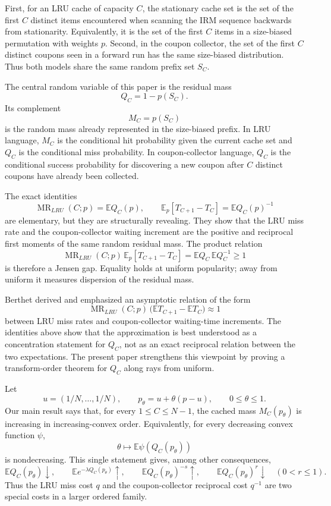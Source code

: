 \documentclass[11pt]{article}
\newcommand{\E}{\mathbb E}
\newcommand{\1}{\mathbf 1}
\newcommand{\MR}{\operatorname{MR}}
\begin{document}
First, for an LRU cache of capacity $C$, the stationary cache set is the set of the first
$C$ distinct items encountered when scanning the IRM sequence backwards from stationarity.
Equivalently, it is the set of the first $C$ items in a size-biased permutation with
weights $p$.  Second, in the coupon collector, the set of the first $C$ distinct coupons
seen in a forward run has the same size-biased distribution.  Thus both models share the
same random prefix set $S_C$.

The central random variable of this paper is the residual mass
\[
        Q_C=1-p(S_C).
\]
Its complement
\[
        M_C=p(S_C)
\]
is the random mass already represented in the size-biased prefix.  In LRU language,
$M_C$ is the conditional hit probability given the current cache set and $Q_C$ is the
conditional miss probability.  In coupon-collector language, $Q_C$ is the conditional
success probability for discovering a new coupon after $C$ distinct coupons have already
been collected.

The exact identities
\begin{equation}\label{eq:basic-identities-intro}
        \MR_{LRU}(C;p)=\E Q_C(p),
        \qquad
        \E_p[T_{C+1}-T_C]=\E Q_C(p)^{-1}
\end{equation}
are elementary, but they are structurally revealing.  They show that the LRU miss rate
and the coupon-collector waiting increment are the positive and reciprocal first moments
of the same random residual mass.  The product relation
\[
        \MR_{LRU}(C;p)\,\E_p[T_{C+1}-T_C]
        =\E Q_C\,\E Q_C^{-1}\ge 1
\]
is therefore a Jensen gap.  Equality holds at uniform popularity; away from uniform it
measures dispersion of the residual mass.

Berthet \cite{Berthet2017} derived and emphasized an asymptotic relation of the form
\[
        \MR_{LRU}(C;p)\,\bigl(\E T_{C+1}-\E T_C\bigr)\approx 1
\]
between LRU miss rates and coupon-collector waiting-time increments.  The identities
above show that the approximation is best understood as a concentration statement for
$Q_C$, not as an exact reciprocal relation between the two expectations.  The present
paper strengthens this viewpoint by proving a transform-order theorem for $Q_C$ along
rays from uniform.

Let
\[
        u=(1/N,\ldots,1/N),\qquad
        p_\theta=u+\theta(p-u),\qquad 0\le \theta\le 1.
\]
Our main result says that, for every $1\le C\le N-1$, the cached mass
$M_C(p_\theta)$ is increasing in increasing-convex order.  Equivalently, for every
decreasing convex function $\psi$,
\[
        \theta\mapsto \E\psi(Q_C(p_\theta))
\]
is nondecreasing.  This single statement gives, among other consequences,
\[
        \E Q_C(p_\theta)\downarrow,
        \qquad
        \E e^{-\lambda Q_C(p_\theta)}\uparrow,
        \qquad
        \E Q_C(p_\theta)^{-s}\uparrow,
        \qquad
        \E Q_C(p_\theta)^r\downarrow\quad(0<r\le1).
\]
Thus the LRU miss cost $q$ and the coupon-collector reciprocal cost $q^{-1}$ are two
special costs in a larger ordered family.
\end{document}
